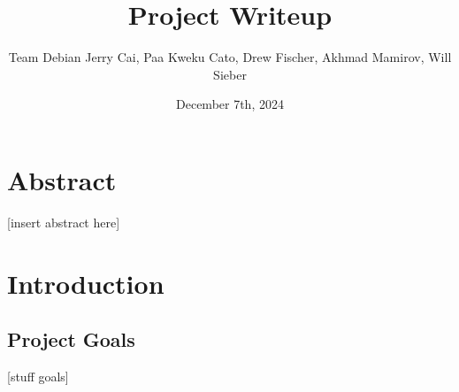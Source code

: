 \documentclass[12pt]{article}
\title{Project Writeup}
\date{December 7th, 2024}
\author{\parbox{\linewidth}{\centering%
	Team Debian
	\endgraf\bigskip
	Jerry Cai, Paa Kweku Cato, Drew Fischer, Akhmad Mamirov, Will Sieber
	\bigskip
}}
\begin{document}
\maketitle

\newpage
\tableofcontents
\newpage

\section{Abstract}
[insert abstract here]
\newpage

\section{Introduction}

\subsection{Project Goals}
[stuff goals]

\newpage


\end{document}
